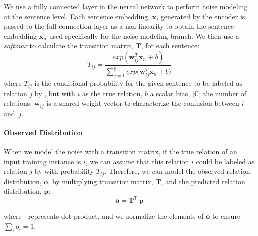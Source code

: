 We use a fully connected layer in the neural network to perform noise
modeling at the sentence level. Each sentence embedding, $\mathbf{x}$,
generated by the encoder is passed to the full connection layer as a  non-linearity to obtain the
sentence embedding $\mathbf{x}_n$ used specifically for the noise modeling
branch.
 We then use a \emph{softmax} to calculate the transition matrix, $\mathbf{T}$, for each sentence:
%
\begin{equation}\label{eq_tm}
T_{ij} = \frac{exp({\mathbf{w}_{ij}^T \mathbf{x}_n + b})}{\sum_{j=1}^{|\mathbb{C}|}{exp({\mathbf{w}_{ij}^T \mathbf{x}_n + b}})}
\end{equation}
where $T_{ij}$ is the conditional probability for the given sentence to be labeled as relation $j$ by \DS, but with $i$ as the true relation, $b$ a scalar bias,  $|\mathbb{C}|$ the number of relations, $\mathbf{w}_{ij}$ is a shared weight vector to characterize the confusion between $i$ and~$j$. %




\paragraph{Observed Distribution}
When we model the noise with a transition matrix, 
if the true relation of an input training instance is $i$, we can assume that this relation $i$ could be labeled as relation $j$ by \DS  with probability $T_{ij}$. Therefore, we can model the observed relation distribution, $\mathbf{o}$, by
multiplying transition matrix, $\mathbf{T}$, and the predicted relation distribution, $\mathbf{p}$: 
 \begin{equation}
\mathbf{o} = \mathbf{T}^T \bm\cdot \mathbf{p}
\label{eq_transition}
 \end{equation}

where $\bm\cdot$ represents dot product, and we normalize the elements of $\mathbf{o}$ to ensure $\sum_i{o_i}=1$.

